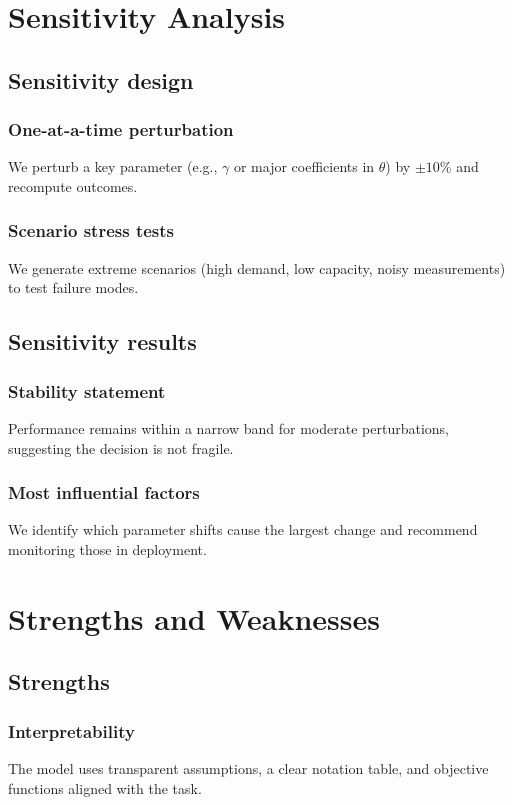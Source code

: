 \documentclass[12pt]{article}
\begin{document}
\section{Sensitivity Analysis}
\label{sec:sensitivity}
\subsection{Sensitivity design}
\subsubsection{One-at-a-time perturbation}
We perturb a key parameter (e.g., $\gamma$ or major coefficients in $\theta$) by $\pm 10\%$ and recompute outcomes.

\subsubsection{Scenario stress tests}
We generate extreme scenarios (high demand, low capacity, noisy measurements) to test failure modes.

\subsection{Sensitivity results}
\subsubsection{Stability statement}
Performance remains within a narrow band for moderate perturbations, suggesting the decision is not fragile.

\subsubsection{Most influential factors}
We identify which parameter shifts cause the largest change and recommend monitoring those in deployment.

\section{Strengths and Weaknesses}
\subsection{Strengths}
\subsubsection{Interpretability}
The model uses transparent assumptions, a clear notation table, and objective functions aligned with the task.
\end{document}
